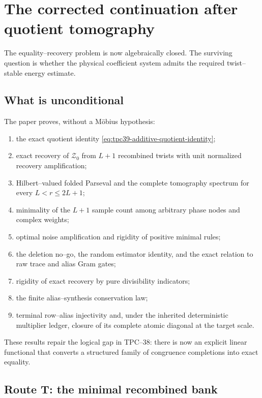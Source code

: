 \section{The corrected continuation after quotient tomography}
\label{sec:tpc39-next-gate}

The equality--recovery problem is now algebraically closed.  The surviving
question is whether the physical coefficient system admits the required
twist--stable energy estimate.

\subsection{What is unconditional}

The paper proves, without a M\"obius hypothesis:
\begin{enumerate}[label=(\roman*)]
 \item the exact quotient identity
 \eqref{eq:tpc39-additive-quotient-identity};
 \item exact recovery of \(\mathscr Z_0\) from \(L+1\) recombined twists
 with unit normalized recovery amplification;
 \item Hilbert--valued folded Parseval and the complete tomography
 spectrum for every \(L<r\le2L+1\);
 \item minimality of the \(L+1\) sample count among arbitrary phase nodes
 and complex weights;
 \item optimal noise amplification and rigidity of positive minimal
 rules;
 \item the deletion no--go, the random estimator identity, and the exact
 relation to raw trace and alias Gram gates;
 \item rigidity of exact recovery by pure divisibility indicators;
 \item the finite alias--synthesis conservation law;
 \item terminal row--alias injectivity and, under the inherited deterministic
 multiplier ledger, closure of its complete atomic diagonal at the target
 scale.
\end{enumerate}

These results repair the logical gap in TPC--38: there is now an explicit
linear functional that converts a structured family of congruence
completions into exact equality.

\subsection{Route T: the minimal recombined bank}

